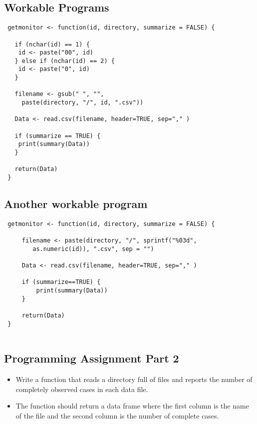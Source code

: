 \documentclass[12pt]{article}
\begin{document}
\subsection{Workable Programs}
\begin{framed}
\begin{verbatim}
 getmonitor <- function(id, directory, summarize = FALSE) {
 
   if (nchar(id) == 1) {
   	id <- paste("00", id)
   } else if (nchar(id) == 2) {
   	id <- paste("0", id)
   }
 
   filename <- gsub(" ", "", 
     paste(directory, "/", id, ".csv"))
   
   Data <- read.csv(filename, header=TRUE, sep="," )
 
   if (summarize == TRUE) {
   	print(summary(Data))
   }
 
   return(Data)
 }
  \end{verbatim}
 \end{framed}
 \newpage
\subsection{ Another workable program}
 \begin{framed}
 \begin{verbatim}
 getmonitor <- function(id, directory, summarize = FALSE) {
 
     filename <- paste(directory, "/", sprintf("%03d", 
        as.numeric(id)), ".csv", sep = "")
 
     Data <- read.csv(filename, header=TRUE, sep="," )
 
     if (summarize==TRUE) {
         print(summary(Data))
     }
 
     return(Data)
 }
 
 \end{verbatim}
  \end{framed}
\newpage


\subsection{Programming Assignment Part 2}
\begin{itemize}
\item Write a function that reads a directory full of files and reports the number of completely observed cases in each data file. \item The function should return a data frame where the first column is the name of the file and the second column is the number of complete cases.
\end{itemize}
\end{document}
